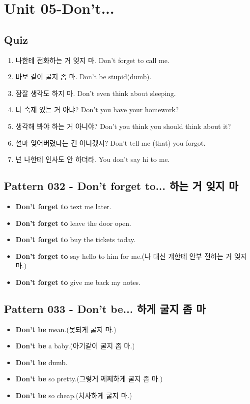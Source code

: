 \documentclass[11pt]{oblivoir}
\begin{document}
\section{Unit 05-Don't...}
\subsection{Quiz}
\begin{enumerate}
  \color{black} \item 나한테 전화하는 거 잊지 마.
    \color{light-gray} Don't forget to call me.
  \color{black} \item 바보 같이 굴지 좀 마.
    \color{light-gray} Don't be stupid(dumb).
  \color{black} \item 잠잘 생각도 하지 마.
    \color{light-gray} Don't even think about sleeping.
  \color{black} \item 너 숙제 있는 거 아냐?
    \color{light-gray} Don't you have your homework?
  \color{black} \item 생각해 봐야 하는 거 아니야?
    \color{light-gray} Don't you think you should think about it?
  \color{black} \item 설마 잊어버렸다는 건 아니겠지?
    \color{light-gray} Don't tell me (that) you forgot.
  \color{black} \item 넌 나한테 인사도 안 하더라.
    \color{light-gray} You don't say hi to me.
\end{enumerate}

\subsection{Pattern 032 - Don't forget to... \texttildelow 하는 거 잊지 마}
\begin{itemize}
  \item \textbf{Don't forget to} text me later.
  \item \textbf{Don't forget to} leave the door open.
  \item \textbf{Don't forget to} buy the tickets today.
  \item \textbf{Don't forget to} say hello to him for me.(나 대신 걔한테 안부 전하는 거 잊지 마.)
  \item \textbf{Don't forget to} give me back my notes.
\end{itemize}

\subsection{Pattern 033 - Don't be... \texttildelow 하게 굴지 좀 마}
\begin{itemize}
  \item \textbf{Don't be} mean.(못되게 굴지 마.)
  \item \textbf{Don't be} a baby.(아기같이 굴지 좀 마.)
  \item \textbf{Don't be} dumb.
  \item \textbf{Don't be} so pretty.(그렇게 쩨쩨하게 굴지 좀 마.)
  \item \textbf{Don't be} so cheap.(치사하게 굴지 마.)
\end{itemize}
\end{document}
